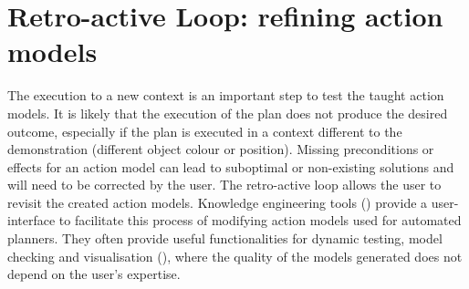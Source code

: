 \section{Retro-active Loop: refining action models}
The execution to a new context is an important step to test the taught action models.
It is likely that the execution of the plan does not produce the desired outcome, especially if the plan is executed in a context different to the demonstration (\eg different object colour or position).
Missing preconditions or effects for an action model can lead to suboptimal or non-existing solutions and will need to be corrected by the user.
The retro-active loop allows the user to revisit the created action models.
Knowledge engineering tools () provide a user-interface to facilitate this process of modifying action models used for automated planners.
They often provide useful functionalities for dynamic testing, model checking and visualisation (\cite{simpson2007planning}), where the quality of the models generated does not depend on the user's expertise.
